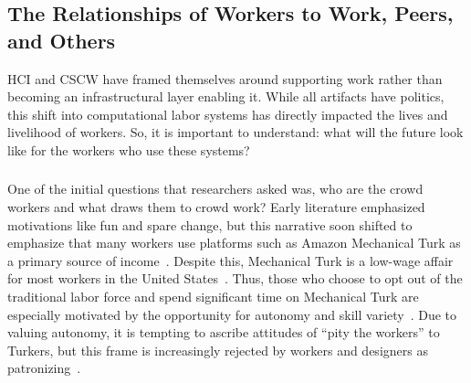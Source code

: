 \documentclass[trackingWork]{subfiles}
\begin{document}
\subsection[What will work and the place of work look like for workers]{The Relationships of Workers to Work, Peers, and Others}\label{sec:relationships}

HCI and CSCW have framed themselves around supporting work rather than becoming an infrastructural layer enabling it. While all artifacts have politics, this shift into computational labor systems has directly impacted the lives and livelihood of workers. So, it is important to understand: what will the future look like for the workers who use these systems?

\subsubsection{\crowdworkpers}
\begin{comment}
	- Workers do it for money
	- Workers coordinate and communicate (gray, being a turker, team stuff). there is mega-drama
	- Workers don't like requesters. have tried to organize
\end{comment}

One of the initial questions that researchers asked was, who are the crowd workers and what draws them to crowd work?
Early literature emphasized motivations like fun and spare change, but this narrative soon shifted to emphasize that many workers use platforms such as Amazon Mechanical Turk as a primary source of income~\cite{kaufmann2011more,ipeirotis2010demographics,Antin2012a}.
Despite this, Mechanical Turk is a low-wage affair for most workers in the United States~\cite{ipeirotis2010demographics,martin2014being,gupta2014turk}.
Thus, those who choose to opt out of the traditional labor force and spend significant time on Mechanical Turk are especially motivated by the opportunity for autonomy and skill variety~\cite{kaufmann2011more}.
Due to valuing autonomy, it is tempting to ascribe attitudes of ``pity the workers'' to Turkers, but this frame is increasingly rejected by workers and designers as patronizing~\cite{storiesIraniSilberman}.
\end{document}
